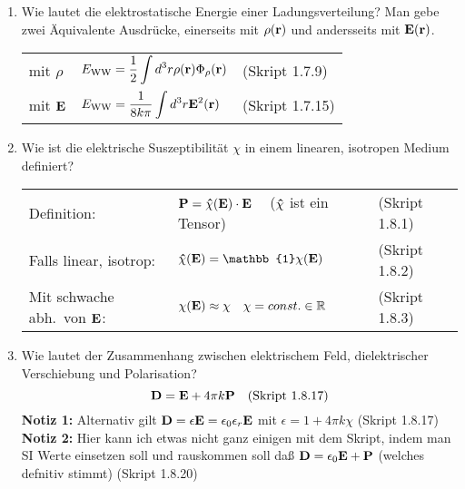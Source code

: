 \documentclass{scrartcl}
\newcommand{\ds}{\displaystyle}
\begin{document}
\begin{enumerate}
    \item Wie lautet die elektrostatische Energie einer Ladungsverteilung?
          Man gebe zwei Äquivalente Ausdrücke, einerseits mit $\rho(\vb r)$
          und andersseits mit $\vb E(\vb r)$.
          \begin{center}
          \begin{tabular}{lll}
            mit $\rho$    & $\ds E_{\text{WW}}=
                            \frac{1}{2}\int d^3 r\rho(\vb r)
                            \Phi_\rho(\vb r)$
                              &(Skript 1.7.9)\\
            mit $\vb E$   & $\ds E_{\text{WW}}=\frac{1}{8k\pi}
                             \int d^3 r\vb E^2(\vb r)$
                              &(Skript 1.7.15)\\
          \end{tabular}
          \end{center}

    \clearpage
    \item Wie ist die elektrische Suszeptibilität $\chi$ in einem 
          linearen, isotropen Medium definiert?
          \begin{center}
          \begin{tabular}{lll}
            Definition:             & $\ds\vb P = 
                                      \vu \chi(\vb E)\cdot \vb E\quad$
                                      ($\vu\chi$ ist ein Tensor)
                                      & (Skript 1.8.1) \\
            Falls linear, isotrop: 
                                    & $\ds\vu\chi(\vb E)=
                                         \mathbb{1}\chi(\vb E)$
                                      & (Skript 1.8.2) \\
            Mit schwache abh.\ von $\vb E$:
                                    & $\chi(\vb E)\approx\chi
                                       \quad\chi=const.\in\mathbb{R}$
                                      & (Skript 1.8.3) \\
            
          \end{tabular}
          \end{center}

    \item Wie lautet der Zusammenhang zwischen elektrischem Feld, 
          dielektrischer Verschiebung und Polarisation?
          $$\vb D = \vb E + 4\pi k\vb P \quad\text{(Skript 1.8.17)}$$
          \textbf{Notiz 1:} Alternativ gilt $\vb D=\epsilon \vb E
          =\epsilon_0\epsilon_r \vb E$ mit
          $\epsilon=1+4\pi k\chi$
          (Skript 1.8.17)\\
          \textbf{Notiz 2:} Hier kann ich etwas nicht ganz einigen mit
          dem Skript, indem man SI Werte einsetzen soll und rauskommen soll
          daß $\vb D=\epsilon_0 \vb E+\vb P$ (welches defnitiv stimmt)
          (Skript 1.8.20)


\end{enumerate}
\end{document}
